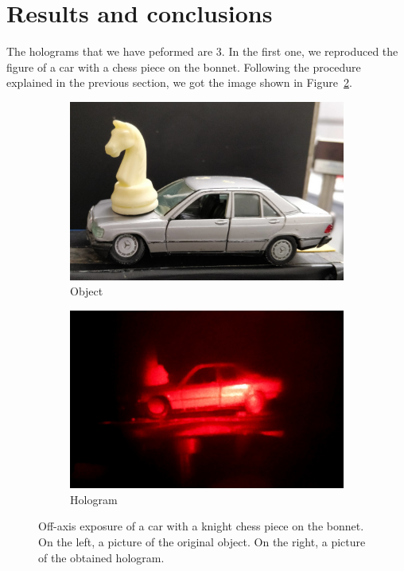 \documentclass[11pt,a4paper]{article}
\begin{document}
\section{Results and conclusions}
The holograms that we have peformed are 3. In the first one, we reproduced the figure of a car with a chess piece on the bonnet. Following the procedure explained in the previous section, we got the image shown in Figure~\ref{fig:off_axis_hologram1}.
\begin{figure}[ht]
\centering
\begin{subfigure}[b]{0.45\textwidth}
\includegraphics[width=\textwidth]{car_knight}
\caption{Object}
\label{fig:car_knight1}
\end{subfigure}
\begin{subfigure}[b]{0.45\textwidth}
\includegraphics[width=\textwidth]{Off-axis_hologram}
\caption{Hologram}
\label{fig:off_axis_hologram1}
\end{subfigure}
\caption{Off-axis exposure of a car with a knight chess piece on the bonnet. On the left, a picture of the original object. On the right, a picture of the obtained hologram.}
\label{fig:off-axis_exposure}
\end{figure}
\end{document}
